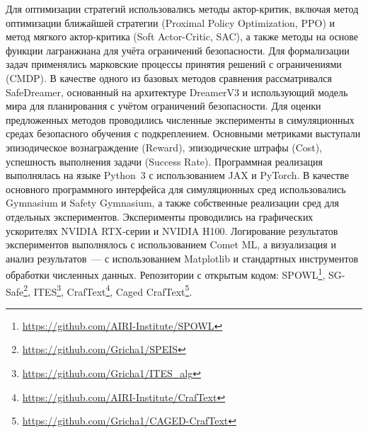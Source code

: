 {\methods}
Для оптимизации стратегий использовались методы актор-критик, включая метод оптимизации ближайшей стратегии (Proximal Policy Optimization, PPO) и метод мягкого актор-критика (Soft Actor-Critic, SAC), а также методы на основе функции лагранжиана для учёта ограничений безопасности. Для формализации задач применялись марковские процессы принятия решений с ограничениями (CMDP). В качестве одного из базовых методов сравнения рассматривался SafeDreamer, основанный на архитектуре DreamerV3 и использующий модель мира для планирования с учётом ограничений безопасности. Для оценки предложенных методов проводились численные эксперименты в симуляционных средах безопасного обучения с подкреплением. Основными метриками выступали эпизодическое вознаграждение (Reward), эпизодические штрафы (Cost), успешность выполнения задачи (Success Rate). Программная реализация выполнялась на языке Python~3 с использованием JAX и PyTorch. В качестве основного программного интерфейса для симуляционных сред использовались Gymnasium и Safety Gymnasium, а также собственные реализации сред для отдельных экспериментов. Эксперименты проводились на графических ускорителях NVIDIA RTX-серии и NVIDIA H100. Логирование результатов экспериментов выполнялось с использованием Comet ML, а визуализация и анализ результатов~--- с использованием Matplotlib и стандартных инструментов обработки численных данных. Репозитории с открытым кодом: SPOWL\footnote{\url{https://github.com/AIRI-Institute/SPOWL}}, SG-Safe\footnote{\url{https://github.com/Gricha1/SPEIS}}, ITES\footnote{\url{https://github.com/Gricha1/ITES_alg}}, CrafText\footnote{\url{https://github.com/AIRI-Institute/CrafText}}, Caged CrafText\footnote{\url{https://github.com/Gricha1/CAGED-CrafText}}.

